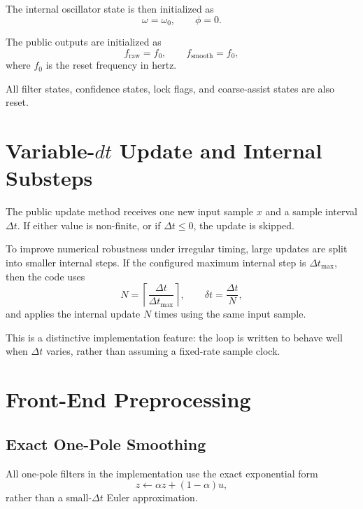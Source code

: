 \documentclass[conference]{IEEEtran}
\begin{document}
The internal oscillator state is then initialized as
\begin{equation}
  \omega = \omega_0,
  \qquad
  \phi = 0.
\end{equation}

The public outputs are initialized as
\begin{equation}
  f_{\mathrm{raw}} = f_0,
  \qquad
  f_{\mathrm{smooth}} = f_0,
\end{equation}
where \(f_0\) is the reset frequency in hertz.

All filter states, confidence states, lock flags, and coarse-assist states are
also reset.

\section{Variable-\(dt\) Update and Internal Substeps}

The public update method receives one new input sample \(x\) and a sample
interval \(\Delta t\). If either value is non-finite, or if \(\Delta t \le 0\),
the update is skipped.

To improve numerical robustness under irregular timing, large updates are split
into smaller internal steps. If the configured maximum internal step is
\(\Delta t_{\max}\), then the code uses
\begin{equation}
  N = \left\lceil \frac{\Delta t}{\Delta t_{\max}} \right\rceil,
  \qquad
  \delta t = \frac{\Delta t}{N},
\end{equation}
and applies the internal update \(N\) times using the same input sample.

This is a distinctive implementation feature: the loop is written to behave
well when \(\Delta t\) varies, rather than assuming a fixed-rate sample clock.

\section{Front-End Preprocessing}\label{sec:frontend}

\subsection{Exact One-Pole Smoothing}

All one-pole filters in the implementation use the exact exponential form
\begin{equation}
  z \leftarrow \alpha z + (1-\alpha)u,
\end{equation}
rather than a small-\(\Delta t\) Euler approximation.
\end{document}
